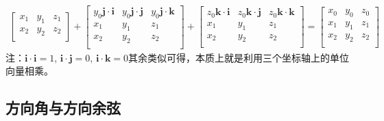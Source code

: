\begin{equation*}
\begin{split}
\begin{bmatrix}
	x_1 & y_1 & z_1\\
	x_2 & y_2 & z_2\\
	\end{bmatrix}+
\begin{bmatrix}
	y_0\boldsymbol{j}\cdot\boldsymbol{i} & y_0\boldsymbol{j}\cdot\boldsymbol{j} & y_0\boldsymbol{j}\cdot\boldsymbol{k}\\
	x_1 & y_1 & z_1\\
	x_2 & y_2 & z_2\\
\end{bmatrix}+
\begin{bmatrix}
	z_0\boldsymbol{k}\cdot\boldsymbol{i} & z_0\boldsymbol{k}\cdot\boldsymbol{j} & z_0\boldsymbol{k}\cdot\boldsymbol{k}\\
	x_1 & y_1 & z_1\\
	x_2 & y_2 & z_2\\
\end{bmatrix}=
\begin{bmatrix}
	x_0 & y_0 & z_0\\
	x_1 & y_1 & z_1\\
	x_2 & y_2 & z_2\\
\end{bmatrix}
	\end{split}
\end{equation*}
注：$\boldsymbol{i}\cdot\boldsymbol{i}=1,\, \boldsymbol{i}\cdot\boldsymbol{j}=0,\, \boldsymbol{i}\cdot\boldsymbol{k}=0$其余类似可得，本质上就是利用三个坐标轴上的单位向量相乘。



\subsection{方向角与方向余弦}
\vspace*{-0.5em}

